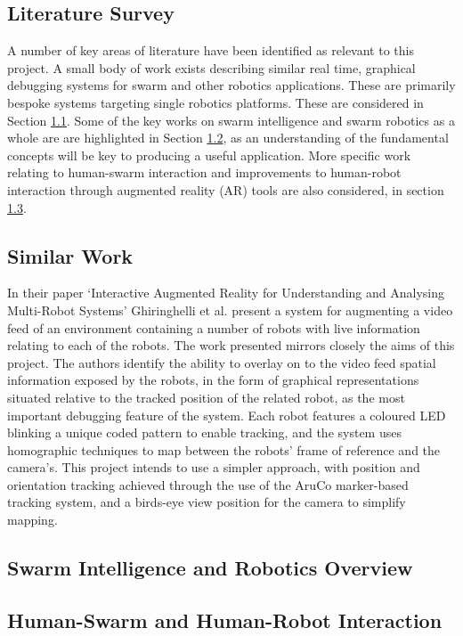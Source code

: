 \documentclass[titlepage,hidelinks,10pt]{article}
\begin{document}
\begin{multicols*}{2}
\section{Literature Survey}
A number of key areas of literature have been identified as relevant to this project. A small body of work exists describing similar real time, graphical debugging systems for swarm and other robotics applications. These are primarily bespoke systems targeting single robotics platforms. These are considered in Section \ref{SimilarWork}. Some of the key works on swarm intelligence and swarm robotics as a whole are are highlighted in Section \ref{GeneralSR}, as an understanding of the fundamental concepts will be key to producing a useful application.  More specific work relating to human-swarm interaction and improvements to human-robot interaction through augmented reality (AR) tools are also considered, in section \ref{HumanSwarmInteraction}.

\subsection{Similar Work} \label{SimilarWork}
In their paper `Interactive Augmented Reality for Understanding and Analysing Multi-Robot Systems' Ghiringhelli et al. present a system for augmenting a video feed of an environment containing a number of robots with live information relating to each of the robots\cite{LEDSwarmAR}. The work presented mirrors closely the aims of this project. The authors identify the ability to overlay on to the video feed spatial information exposed by the robots, in the form of graphical representations situated relative to the tracked position of the related robot, as the most important debugging feature of the system. Each robot features a coloured LED blinking a unique coded pattern to enable tracking, and the system uses homographic techniques to map between the robots' frame of reference and the camera's. This project intends to use a simpler approach, with position and orientation tracking achieved through the use of the AruCo marker-based tracking system, and a birds-eye view position for the camera to simplify mapping.

\subsection{Swarm Intelligence and Robotics Overview} \label{GeneralSR}

\subsection{Human-Swarm and Human-Robot Interaction} \label{HumanSwarmInteraction}



\end{multicols*}
\end{document}
